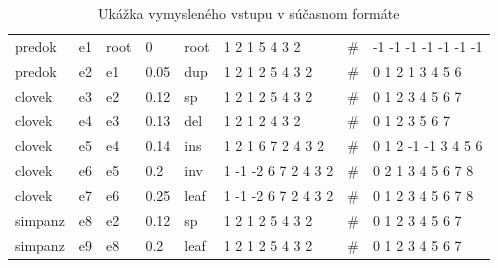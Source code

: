 \begin{table}[!htb]
\label{tab:vstup}
\begin{center}
\begin{tabular}{llllllll}
predok & e1 & root & 0 & root & 1 2 1 5 4 3 2 & \#  & -1 -1 -1 -1 -1 -1 -1 \\
predok & e2 & e1 &  0.05 & dup &  1 2 1 2 5 4 3 2 & \# & 0 1 2 1 3 4 5 6 \\
clovek & e3 & e2 &  0.12 & sp &   1 2 1 2 5 4 3 2 & \# & 0 1 2 3 4 5 6 7 \\
clovek & e4 & e3 &  0.13 & del & 1 2 1 2 4 3 2 & \# & 0 1 2 3 5 6 7 \\
clovek & e5 & e4 &  0.14 & ins & 1 2 1 6 7 2 4 3 2 & \# & 0 1 2 -1 -1 3 4 5 6 \\
clovek &  e6 & e5 &  0.2 & inv &  1 -1 -2 6 7 2 4 3 2 & \# & 0 2 1 3 4 5 6 7 8 \\
clovek & e7 & e6 &  0.25 & leaf & 1 -1 -2 6 7 2 4 3 2 & \# & 0 1 2 3 4 5 6 7 8 \\
simpanz & e8 & e2  & 0.12 & sp &  1 2 1 2 5 4 3 2 & \# & 0 1 2 3 4 5 6 7 \\
simpanz & e9 & e8 &  0.2 & leaf & 1 2 1 2 5 4 3 2 & \# & 0 1 2 3 4 5 6 7 \\
 \end{tabular}

\end{center}
\caption{Ukážka vymysleného vstupu v súčasnom formáte \cite{biowiki}}
\end{table}


